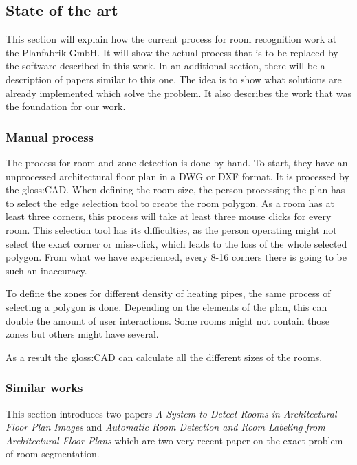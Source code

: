 \subsection{State of the art}
This section will explain how the current process for room recognition work at the Planfabrik GmbH. It will show the actual process that is to be replaced by the software described in this work. In an additional section, there will be a description of papers similar to this one. The idea is to show what solutions are already implemented which solve the problem. It also describes the work that was the foundation for our work.

\subsubsection{Manual process}
 The process for room and zone detection is done by hand. To start, they have an unprocessed architectural floor plan in a DWG or DXF format. It is processed by the \gls{gloss:CAD}. When defining the room size, the person processing the plan has to select the edge selection tool to create the room polygon. As a room has at least three corners, this process will take at least three mouse clicks for every room. This selection tool has its difficulties, as the person operating might not select the exact corner or miss-click, which leads to the loss of the whole selected polygon. From what we have experienced, every 8-16 corners there is going to be such an inaccuracy.
 
 To define the zones for different density of heating pipes, the same process of selecting a polygon is done. Depending on the elements of the plan, this can double the amount of user interactions. Some rooms might not contain those zones but others might have several.
 
 As a result the \gls{gloss:CAD} can calculate all the different sizes of the rooms.
 
\subsubsection{Similar works}
This section introduces two papers \textit{A System to Detect Rooms in Architectural Floor Plan Images} \citep{mace_valveny_loctea_tabbone_2010} and \textit{Automatic Room Detection and Room Labeling from Architectural Floor Plans} \citep{ahmed_liwicki_weber_dengel_2012} which are two very recent paper on the exact problem of room segmentation. 

